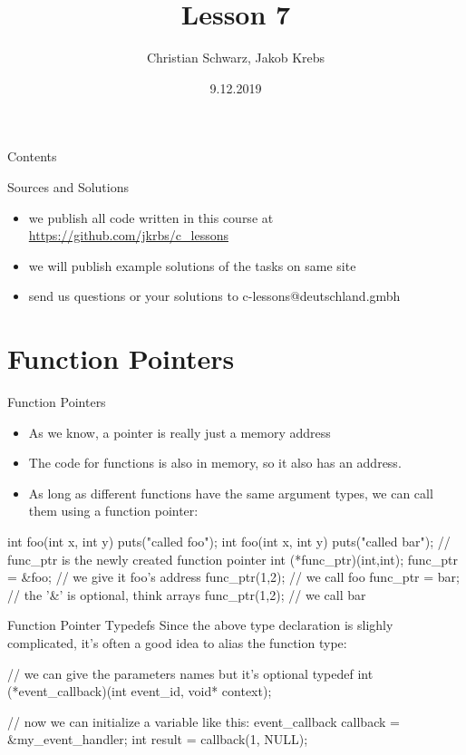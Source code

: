 \documentclass[10pt,graphics,aspectratio=169,table]{beamer}
\title{Lesson 7}
\author{Christian Schwarz, Jakob Krebs}
\date{9.12.2019}
\begin{document}
\maketitle

\begin{frame}{Contents}
    \tableofcontents
\end{frame}

\begin{frame}{Sources and Solutions}
    \begin{itemize}
        \item we publish all code written in this course at \url{https://github.com/jkrbs/c_lessons}
        \item we will publish example solutions of the tasks on same site
        \item send us questions or your solutions to c-lessons@deutschland.gmbh
    \end{itemize}
\end{frame}


\section{Function Pointers}
\begin{frame}[fragile]{Function Pointers}
    \begin{itemize}
        \item As we know, a pointer is really just a memory address
        \item The code for functions is also in memory, so it also has an address.
        \item As long as different functions have the same argument types, we
        can call them using a function pointer:
    \end{itemize}

    \begin{codeblock}
int foo(int x, int y){ puts("called foo"); }
int foo(int x, int y){ puts("called bar"); }
// func_ptr is the newly created function pointer 
int (*func_ptr)(int,int);
func_ptr = &foo; // we give it foo's address
func_ptr(1,2); // we call foo
func_ptr = bar; // the '&' is optional, think arrays
func_ptr(1,2); // we call bar
    \end{codeblock}

\end{frame}


\begin{frame}[fragile]{Function Pointer Typedefs}
    Since the above type declaration is slighly complicated,
    it's often a good idea to alias the function type:
    \begin{codeblock}
// we can give the parameters names but it's optional
typedef int (*event_callback)(int event_id, void* context);

// now we can initialize a variable like this:
event_callback callback = &my_event_handler;
int result = callback(1, NULL);
    \end{codeblock}

\end{frame}
\end{document}
